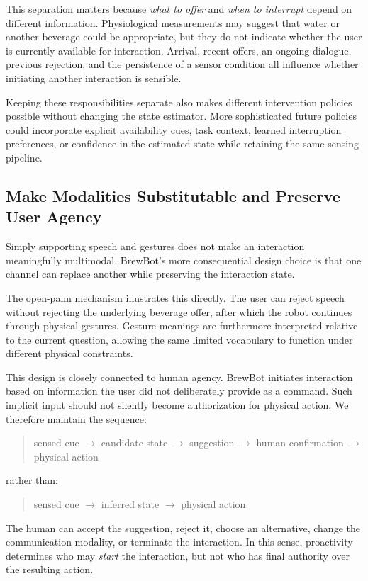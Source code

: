This separation matters because \emph{what to offer} and \emph{when to
interrupt} depend on different information. Physiological measurements may
suggest that water or another beverage could be appropriate, but they do not
indicate whether the user is currently available for interaction. Arrival,
recent offers, an ongoing dialogue, previous rejection, and the persistence of a
sensor condition all influence whether initiating another interaction is
sensible.

Keeping these responsibilities separate also makes different intervention
policies possible without changing the state estimator. More sophisticated
future policies could incorporate explicit availability cues, task context,
learned interruption preferences, or confidence in the estimated state while
retaining the same sensing pipeline.

\subsection{Make Modalities Substitutable and Preserve User Agency}

Simply supporting speech and gestures does not make an interaction meaningfully
multimodal. BrewBot's more consequential design choice is that one channel can
replace another while preserving the interaction state.

The open-palm mechanism illustrates this directly. The user can reject speech
without rejecting the underlying beverage offer, after which the robot continues
through physical gestures. Gesture meanings are furthermore interpreted relative
to the current question, allowing the same limited vocabulary to function under
different physical constraints.

This design is closely connected to human agency. BrewBot initiates interaction
based on information the user did not deliberately provide as a command. Such
implicit input should not silently become authorization for physical action. We
therefore maintain the sequence:
\begin{quote}
sensed cue $\rightarrow$ candidate state $\rightarrow$ suggestion $\rightarrow$
human confirmation $\rightarrow$ physical action
\end{quote}
rather than:
\begin{quote}
sensed cue $\rightarrow$ inferred state $\rightarrow$ physical action
\end{quote}

The human can accept the suggestion, reject it, choose an alternative, change
the communication modality, or terminate the interaction. In this sense,
proactivity determines who may \emph{start} the interaction, but not who has
final authority over the resulting action.

